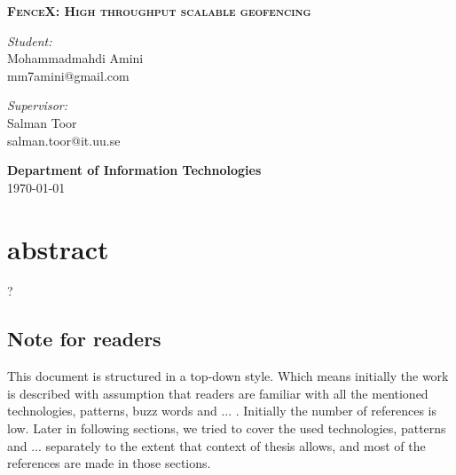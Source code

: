 \documentclass[a4]{report}
\begin{document}
\begin{titlepage}
        \noindent\makebox[\linewidth]{\rule{\linewidth}{1.2pt}}
        \textsc{ \textbf{\large FenceX: High throughput scalable geofencing }}
        \noindent\makebox[\linewidth]{\rule{\linewidth}{1.2pt}}

        \vspace{0.5in}

        \begin{minipage}{0.48\textwidth}
            \begin{flushleft}
                \textit{Student:} \\
                Mohammadmahdi Amini \\
                mm7amini@gmail.com
            \end{flushleft}
        \end{minipage}
        \begin{minipage}{0.48\textwidth}
            \begin{flushright}
                \textit{Supervisor:} \\
                Salman Toor \\
                salman.toor@it.uu.se
            \end{flushright}
        \end{minipage}

        \vspace{2in}

        \textbf{\large Department of Information Technologies} \\

        \today

    \end{titlepage}

    \newpage

    \setcounter{page}{2}
    \tableofcontents
    \newpage

    \listoffigures
    \newpage


    \section{abstract}
    ?

    \subsection{Note for readers}
    This document is structured in a top-down style.
    Which means initially the work is described with assumption that readers are familiar with all the mentioned
    technologies,  patterns, buzz words and ... .
    Initially the number of references is low.
    Later in following sections, we tried to cover the used technologies, patterns and ... separately to the extent
    that context of thesis allows, and most of the references are made in those sections.
\end{document}

